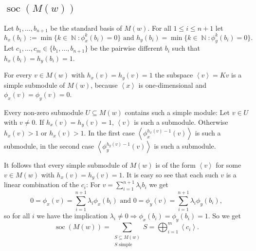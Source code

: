 \documentclass[a4paper,10pt]{article}
\theoremstyle{definition}
\newcommand{\N}{\operatorname{\mathbb{N}}}
\newcommand{\soc}{\operatorname{soc}}
\newcommand{\gen}[1]{\left\langle#1\right\rangle}
\begin{document}
\section{}


\subsection*{$\soc(M(w))$}
Let $b_1, \ldots, b_{n+1}$ be the standard basis of $M(w)$. For all $1 \leq i \leq n+1$ let
\[
 h_x(b_i) := \min \{k \in \N : \phi^k_x(b_i) = 0\} \text{ and }
 h_y(b_i) = \min \{k \in \N : \phi^k_y(b_i) = 0\}.
\]
Let $c_1, \ldots, c_m \in \{b_1, \ldots, b_{n+1}\}$ be the pairwise different $b_i$ such that $h_x(b_i) = h_y(b_i) = 1$.

For every $v \in M(w)$ with $h_x(v) = h_y(v) = 1$ the subspace $\gen{v} = K v$ is a simple submodule of $M(w)$, because $\gen{x}$ is one-dimensional and $\phi_x(v) = \phi_y(v) = 0$.

Every non-zero submodule $U \subseteq M(w)$ contains such a simple module: Let $v \in U$ with $v \neq 0$. If $h_x(v) = h_y(v) = 1$, $\gen{v}$ is such a submodule. Otherwise $h_x(v) > 1$ or $h_x(v) > 1$. In the first case $\gen{\phi^{h_x(v)-1}_x(v)}$ is such a submodule, in the second case $\gen{\phi^{h_y(v)-1}_y(v)}$ is such a submodule.

It follows that every simple submodule of $M(w)$ is of the form $\gen{v}$ for some $v \in M(w)$ with $h_x(v) = h_y(v) = 1$. It is easy so see that each such $v$ is a linear combination of the $c_i$: For $v = \sum_{i=1}^{n+1} \lambda_i b_i$ we get
\[
 0 = \phi_x(v) = \sum_{i=1}^{n+1} \lambda_i \phi_x(b_i)
 \text{ and }
 0 = \phi_y(v) = \sum_{i=1}^{n+1} \lambda_i \phi_y(b_i),
\]
so for all $i$ we have the implication $\lambda_i \neq 0 \Rightarrow \phi_x(b_i) = \phi_y(b_i) = 1$. So we get
\[
 \soc(M(w))
 = \sum_{\substack{S \subseteq M(w) \\ S \text{ simple}}} S
 = \bigoplus_{i=1}^m \gen{c_i}.
\]
\end{document}
